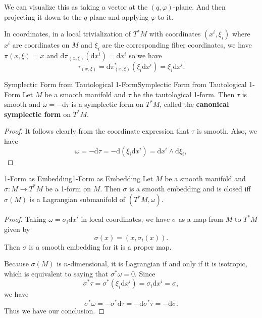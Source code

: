 \documentclass[../main.tex]{subfiles}
\begin{document}
\begin{remark}
  We can visualize this as taking a vector at the $(q, \varphi)$-plane. And then projecting it down to the $q$-plane and applying $\varphi$ to it.
\end{remark}

In coordinates, in a local trivialization of $T^* M$ with coordinates $(x^i, \xi_i)$ where $x^i$ are coordinates on $M$ and $\xi_i$ are the corresponding fiber coordinates, we have $\pi(x, \xi) = x$ and $\mathrm{d} \pi_{(x, \xi)}(\mathrm{d} x^i) = \mathrm{d} x^i$ so we have
\begin{equation}
  \tau_{(x, \xi)} = \mathrm{d} \pi_{(x, \xi)}^* (\xi_i \mathrm{d} x^i) = \xi_i \mathrm{d} x^i.
\end{equation}

\begin{proposition}{Symplectic Form from Tautological 1-Form}{Symplectic Form from Tautological 1-Form}
  Let $M$ be a smooth manifold and $\tau$ be the tautological 1-form. Then $\tau$ is smooth and $\omega = -\mathrm{d} \tau$ is a symplectic form on $T^* M$, called the \textbf{canonical symplectic form} on $T^* M$.
\end{proposition}
\begin{proof}
  It follows clearly from the coordinate expression that $\tau$ is smooth. Also, we have
  \begin{equation}
    \omega = -\mathrm{d} \tau = -\mathrm{d} (\xi_i \mathrm{d} x^i) = \mathrm{d} x^i \wedge \mathrm{d} \xi_i,
  \end{equation}
\end{proof}

\begin{proposition}{1-Form as Embedding}{1-Form as Embedding}
  Let $M$ be a smooth manifold and $\sigma: M \rightarrow T^*M$ be a 1-form on $M$. Then $\sigma$ is a smooth embedding and is closed iff $\sigma(M)$ is a Lagrangian submanifold of $(T^* M, \omega)$.
\end{proposition}
\begin{proof}
  Taking $\omega = \sigma_i \mathrm{d} x^i$ in local coordinates, we have $\sigma$ as a map from $M$ to $T^* M$ given by
  \begin{equation*}
    \sigma(x) = (x, \sigma_i(x)).
  \end{equation*}
  Then $\sigma$ is a smooth embedding for it is a proper map.

  Because $\sigma(M)$ is $n$-dimensional, it is Lagrangian if and only if it is isotropic, which is equivalent to saying that $\sigma^* \omega = 0$. Since
  \begin{equation*}
    \sigma^* \tau = \sigma^* (\xi_i \mathrm{d} x^i) = \sigma_i \mathrm{d} x^i = \sigma,
  \end{equation*}
  we have
  \begin{equation*}
    \sigma^* \omega = -\sigma^* \mathrm{d} \tau = -\mathrm{d} \sigma^* \tau = -\mathrm{d} \sigma.
  \end{equation*}
  Thus we have our conclusion.
\end{proof}
\end{document}
